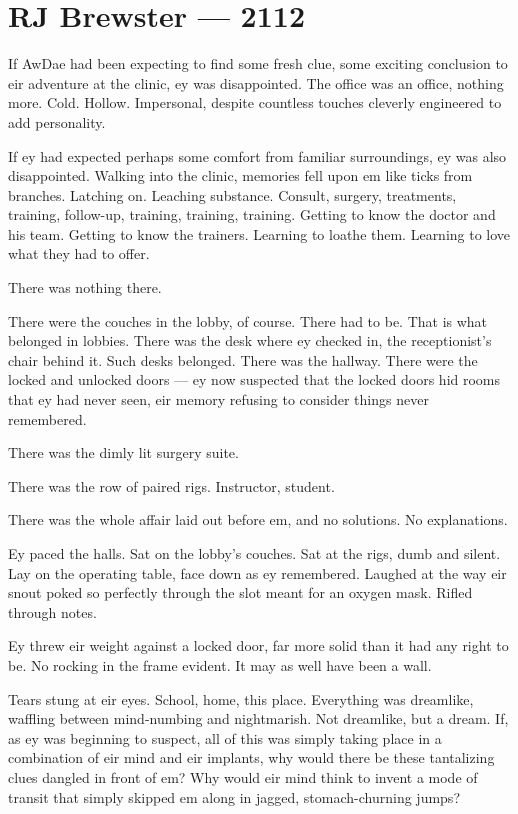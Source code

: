 \hypertarget{rj-brewster-2112}{%
\chapter*{RJ Brewster — 2112}\label{rj-brewster-2112}}

If AwDae had been expecting to find some fresh clue, some exciting conclusion to eir adventure at the clinic, ey was disappointed. The office was an office, nothing more. Cold. Hollow. Impersonal, despite countless touches cleverly engineered to add personality.

If ey had expected perhaps some comfort from familiar surroundings, ey was also disappointed. Walking into the clinic, memories fell upon em like ticks from branches. Latching on. Leaching substance. Consult, surgery, treatments, training, follow-up, training, training, training. Getting to know the doctor and his team. Getting to know the trainers. Learning to loathe them. Learning to love what they had to offer.

There was nothing there.

There were the couches in the lobby, of course. There had to be. That is what belonged in lobbies. There was the desk where ey checked in, the receptionist's chair behind it. Such desks belonged. There was the hallway. There were the locked and unlocked doors — ey now suspected that the locked doors hid rooms that ey had never seen, eir memory refusing to consider things never remembered.

There was the dimly lit surgery suite.

There was the row of paired rigs. Instructor, student.

There was the whole affair laid out before em, and no solutions. No explanations.

Ey paced the halls. Sat on the lobby's couches. Sat at the rigs, dumb and silent. Lay on the operating table, face down as ey remembered. Laughed at the way eir snout poked so perfectly through the slot meant for an oxygen mask. Rifled through notes.

Ey threw eir weight against a locked door, far more solid than it had any right to be. No rocking in the frame evident. It may as well have been a wall.

Tears stung at eir eyes. School, home, this place. Everything was dreamlike, waffling between mind-numbing and nightmarish. Not dreamlike, but a dream. If, as ey was beginning to suspect, all of this was simply taking place in a combination of eir mind and eir implants, why would there be these tantalizing clues dangled in front of em? Why would eir mind think to invent a mode of transit that simply skipped em along in jagged, stomach-churning jumps?

